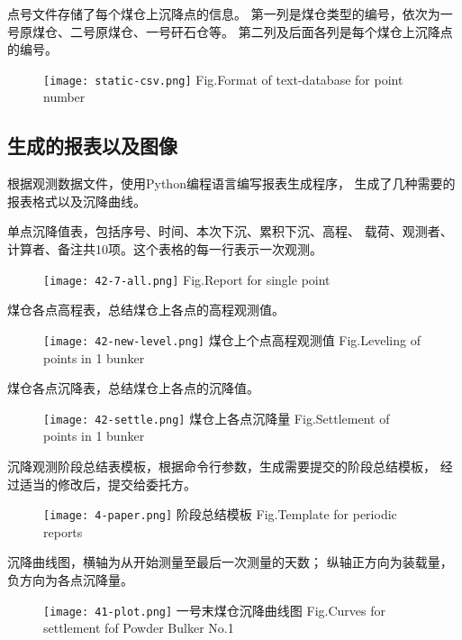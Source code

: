 \newpage
点号文件存储了每个煤仓上沉降点的信息。
第一列是煤仓类型的编号，依次为一号原煤仓、二号原煤仓、一号矸石仓等。
第二列及后面各列是每个煤仓上沉降点的编号。
\begin{figure}[!htbp]
   \centering
   \texttt{[image: static-csv.png]}
			{Fig.}{Format of text-database for point number}
\end{figure}

\subsection{生成的报表以及图像}
根据观测数据文件，使用Python编程语言编写报表生成程序，
生成了几种需要的报表格式以及沉降曲线。

单点沉降值表，包括序号、时间、本次下沉、累积下沉、高程、
载荷、观测者、计算者、备注共10项。这个表格的每一行表示一次观测。
\begin{figure}[!htbp]
   \centering
   \texttt{[image: 42-7-all.png]}
			{Fig.}{Report for single point}
\end{figure}

\newpage
煤仓各点高程表，总结煤仓上各点的高程观测值。
\begin{figure}[!htbp]
   \centering
   \texttt{[image: 42-new-level.png]}
					{煤仓上个点高程观测值}
			{Fig.}{Leveling of points in 1 bunker}
\end{figure}

煤仓各点沉降表，总结煤仓上各点的沉降值。
\begin{figure}[!htbp]
   \centering
   \texttt{[image: 42-settle.png]}
					{煤仓上各点沉降量}
			{Fig.}{Settlement of points in 1 bunker}
\end{figure}
\newpage

沉降观测阶段总结表模板，根据命令行参数，生成需要提交的阶段总结模板，
经过适当的修改后，提交给委托方。
\begin{figure}[!htbp]
   \centering
   \texttt{[image: 4-paper.png]}
				    {阶段总结模板}
			{Fig.}{Template for periodic reports}
\end{figure}

沉降曲线图，横轴为从开始测量至最后一次测量的天数；
纵轴正方向为装载量，负方向为各点沉降量。
\begin{figure}[!htbp]
   \centering
   \texttt{[image: 41-plot.png]}
				    {一号末煤仓沉降曲线图}
			{Fig.}{Curves for settlement fof Powder Bulker No.1}
\end{figure}

